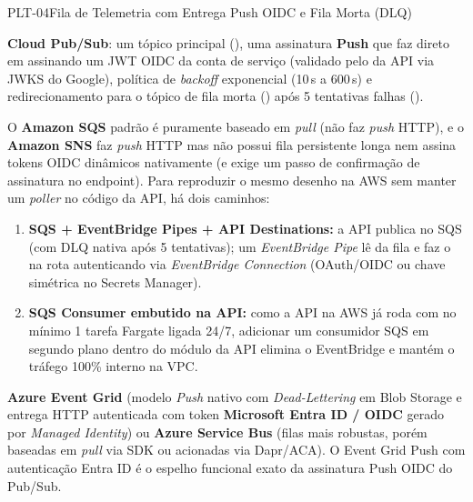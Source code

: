 \begin{pecaarq}{PLT-04}{Fila de Telemetria com Entrega Push OIDC e Fila Morta (DLQ)}{\sgcp~\nativo\enspace\saws~\adaptacao\enspace\sazure~\equivalente}
\begin{campos}
  \item[Como é hoje (GCP)] \textbf{Cloud Pub/Sub}: um tópico principal
    (), uma assinatura \textbf{Push} que faz
     direto em  assinando
    um JWT OIDC da conta de serviço  (validado pelo
     da API via JWKS do Google), política de \emph{backoff}
    exponencial (10\,s a 600\,s) e redirecionamento para o tópico de fila morta
    () após 5 tentativas falhas ().
  \item[Equivalente AWS] O \textbf{Amazon SQS} padrão é puramente baseado em
    \emph{pull} (não faz \emph{push} HTTP), e o \textbf{Amazon SNS} faz
    \emph{push} HTTP mas não possui fila persistente longa nem assina tokens OIDC
    dinâmicos nativamente (e exige um passo de confirmação de assinatura
     no endpoint). Para reproduzir o mesmo desenho
    na AWS sem manter um \emph{poller} no código da API, há dois caminhos:
    \begin{enumerate}
      \item \textbf{SQS + EventBridge Pipes + API Destinations:} a API publica no
        SQS (com DLQ nativa após 5 tentativas); um \emph{EventBridge Pipe} lê da
        fila e faz o  na rota  autenticando via
        \emph{EventBridge Connection} (OAuth/OIDC ou chave simétrica no
        Secrets Manager).
      \item \textbf{SQS Consumer embutido na API:} como a API na AWS já roda com
        no mínimo 1 tarefa Fargate ligada 24/7, adicionar um consumidor SQS em
        segundo plano dentro do módulo  da API elimina o
        EventBridge e mantém o tráfego 100\% interno na VPC.
    \end{enumerate}
  \item[Equivalente Azure] \textbf{Azure Event Grid} (modelo \emph{Push} nativo
    com \emph{Dead-Lettering} em Blob Storage e entrega HTTP autenticada com
    token \textbf{Microsoft Entra ID / OIDC} gerado por \emph{Managed Identity})
    ou \textbf{Azure Service Bus} (filas mais robustas, porém baseadas em
    \emph{pull} via SDK ou acionadas via Dapr/ACA). O Event Grid Push com
    autenticação Entra ID é o espelho funcional exato da assinatura Push OIDC do
    Pub/Sub.
\end{campos}
\end{pecaarq}

